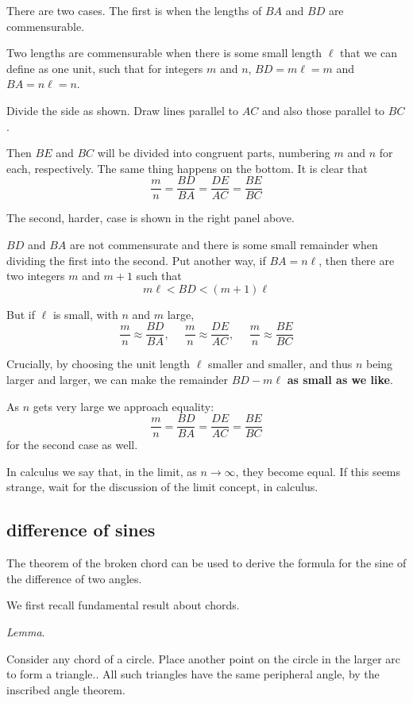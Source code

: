 \documentclass[11pt, oneside]{article}
\begin{document}
There are two cases.  The first is when the lengths of $BA$ and $BD$ are commensurable.  

Two lengths are commensurable when there is some small length $\ell$ that we can define as one unit, such that for integers $m$ and $n$, $BD = m\ell = m$ and $BA = n\ell = n$.

Divide the side as shown.  Draw lines parallel to $AC$ and also those parallel to $BC$.  

Then $BE$ and $BC$ will be divided into congruent parts, numbering $m$ and $n$ for each, respectively.  The same thing happens on the bottom.  It is clear that 
\[ \frac{m}{n} = \frac{BD}{BA} = \frac{DE}{AC} = \frac{BE}{BC} \]

The second, harder, case is shown in the right panel above.  

$BD$ and $BA$ are not commensurate and there is some small remainder when dividing the first into the second.  Put another way, if $BA = n\ell$, then there are two integers $m$ and $m+1$ such that
\[ m\ell < BD < (m+1)\ell \]

But if $\ell$ is small, with $n$ and $m$  large,
\[ \frac{m}{n} \approx \frac{BD}{BA}, \ \ \ \ \ \ \frac{m}{n} \approx \frac{DE}{AC}, \ \ \ \ \ \ \frac{m}{n} \approx  \frac{BE}{BC} \]

Crucially, by choosing the unit length $\ell$ smaller and smaller, and thus $n$ being larger and larger, we can make the remainder $BD - m\ell$ \textbf{as small as we like}.  

As $n$ gets very large we approach equality:
\[ \frac{m}{n} = \frac{BD}{BA} = \frac{DE}{AC} = \frac{BE}{BC} \]
for the second case as well.

In calculus we say that, in the limit, as $n \rightarrow \infty$, they become equal.  If this seems strange, wait for the discussion of the limit concept, in calculus.

\subsection*{difference of sines}

The theorem of the broken chord can be used to derive the formula for the sine of the difference of two angles.

We first recall fundamental result about chords.

\emph{Lemma}.

Consider any chord of a circle.  Place another point on the circle in the larger arc to form a triangle..  All such triangles have the same peripheral angle, by the inscribed angle theorem.
\end{document}
